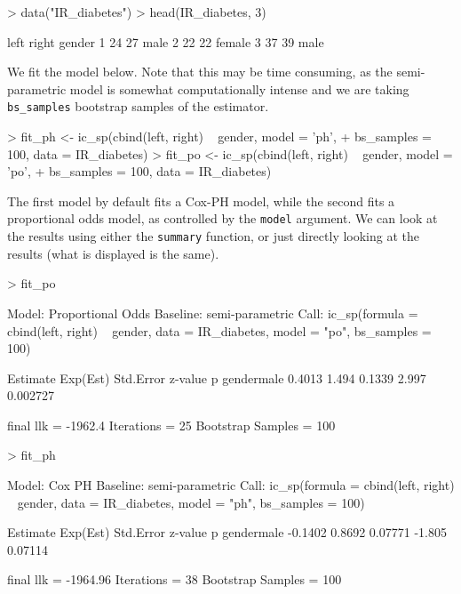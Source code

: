 \documentclass[a4paper]{article}
\begin{document}
\begin{Schunk}
\begin{Sinput}
> data("IR_diabetes")
> head(IR_diabetes, 3)
\end{Sinput}
\begin{Soutput}
  left right gender
1   24    27   male
2   22    22 female
3   37    39   male
\end{Soutput}
\end{Schunk}
  
We fit the model below. Note that this may be time consuming, as the semi-parametric model is somewhat computationally intense and we are taking \texttt{bs\_samples} bootstrap samples of the estimator. 
  
\begin{Schunk}
\begin{Sinput}
>   fit_ph <- ic_sp(cbind(left, right) ~ gender, model = 'ph', 
+                   bs_samples = 100, data = IR_diabetes)
>   fit_po <- ic_sp(cbind(left, right) ~ gender, model = 'po',
+                   bs_samples = 100, data = IR_diabetes)
\end{Sinput}
\end{Schunk}

The first model by default fits a Cox-PH model, while the second fits a proportional odds model, as controlled by the \texttt{model} argument. We can look at the results using either the \texttt{summary} function, or just directly looking at the results (what is displayed is the same). 
  
\begin{Schunk}
\begin{Sinput}
>   fit_po
\end{Sinput}
\begin{Soutput}
Model:  Proportional Odds
Baseline:  semi-parametric 
Call: ic_sp(formula = cbind(left, right) ~ gender, data = IR_diabetes, 
    model = "po", bs_samples = 100)

           Estimate Exp(Est) Std.Error z-value        p
gendermale   0.4013    1.494    0.1339   2.997 0.002727

final llk =  -1962.4 
Iterations =  25 
Bootstrap Samples =  100 
\end{Soutput}
\begin{Sinput}
>   fit_ph
\end{Sinput}
\begin{Soutput}
Model:  Cox PH
Baseline:  semi-parametric 
Call: ic_sp(formula = cbind(left, right) ~ gender, data = IR_diabetes, 
    model = "ph", bs_samples = 100)

           Estimate Exp(Est) Std.Error z-value       p
gendermale  -0.1402   0.8692   0.07771  -1.805 0.07114

final llk =  -1964.96 
Iterations =  38 
Bootstrap Samples =  100 
\end{Soutput}
\end{Schunk}
\end{document}

